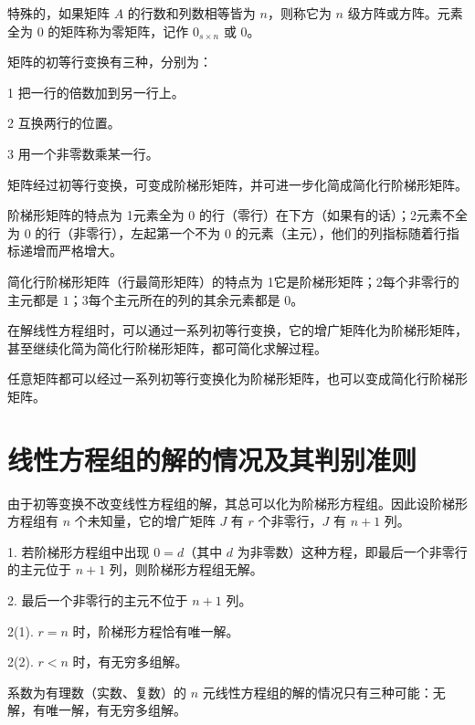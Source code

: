 特殊的，如果矩阵 $A$ 的行数和列数相等皆为 $n$，则称它为 $n$ 级方阵或方阵。元素全为 $0$ 的矩阵称为零矩阵，记作 $0_{s\times n}$ 或 $0$。

\begin{definition}[初等行变换]
	矩阵的初等行变换有三种，分别为：
	
	\num{1} 把一行的倍数加到另一行上。

	\num{2} 互换两行的位置。

	\num{3} 用一个非零数乘某一行。
\end{definition}

矩阵经过初等行变换，可变成阶梯形矩阵，并可进一步化简成简化行阶梯形矩阵。

阶梯形矩阵的特点为 \num{1}元素全为 $0$ 的行（零行）在下方（如果有的话）；\num{2}元素不全为 $0$ 的行（非零行），左起第一个不为 $0$ 的元素（主元），他们的列指标随着行指标递增而严格增大。

简化行阶梯形矩阵（行最简形矩阵）的特点为 \num{1}它是阶梯形矩阵；\num{2}每个非零行的主元都是 $1$；\num{3}每个主元所在的列的其余元素都是 $0$。

在解线性方程组时，可以通过一系列初等行变换，它的增广矩阵化为阶梯形矩阵，甚至继续化简为简化行阶梯形矩阵，都可简化求解过程。

\begin{theorem}
	任意矩阵都可以经过一系列初等行变换化为阶梯形矩阵，也可以变成简化行阶梯形矩阵。
\end{theorem}

\section{线性方程组的解的情况及其判别准则}


由于初等变换不改变线性方程组的解，其总可以化为阶梯形方程组。因此设阶梯形方程组有 $n$ 个未知量，它的增广矩阵 $J$ 有 $r$ 个非零行，$J$ 有 $n+1$ 列。

1. 若阶梯形方程组中出现 $0=d$（其中 $d$ 为非零数）这种方程，即最后一个非零行的主元位于 $n+1$ 列，则阶梯形方程组无解。

2. 最后一个非零行的主元不位于 $n+1$ 列。

2(1). $r=n$ 时，阶梯形方程恰有唯一解。

2(2). $r<n$ 时，有无穷多组解。

\begin{theorem}
	系数为有理数（实数、复数）的 $n$ 元线性方程组的解的情况只有三种可能：无解，有唯一解，有无穷多组解。
\end{theorem}

